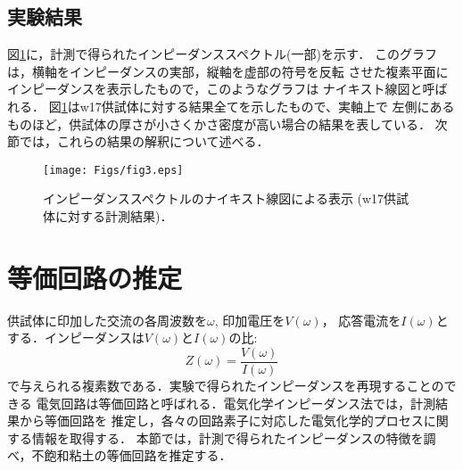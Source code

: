 \documentclass{jsce}
\begin{document}
\subsection{実験結果}
図\ref{fig:fig3}に，計測で得られたインピーダンススペクトル(一部)を示す．
このグラフは，横軸をインピーダンスの実部，縦軸を虚部の符号を反転
させた複素平面にインピーダンスを表示したもので，このようなグラフは
ナイキスト線図と呼ばれる．
図\ref{fig:fig3}はw17供試体に対する結果全てを示したもので、実軸上で
左側にあるものほど，供試体の厚さが小さくかさ密度が高い場合の結果を表している．
次節では，これらの結果の解釈について述べる．
\begin{figure}[h]
	\begin{center}
	\texttt{[image: Figs/fig3.eps]} 
	\end{center}
	\caption{
		インピーダンススペクトルのナイキスト線図による表示
		(w17供試体に対する計測結果)．
	} 
	\label{fig:fig3}
\end{figure}
\section{等価回路の推定}
供試体に印加した交流の各周波数を$\omega$, 印加電圧を$V(\omega)$，
応答電流を$I(\omega)$とする．インピーダンスは$V(\omega)$と$I(\omega)$の比:
\begin{equation}
	Z(\omega)=\frac{V(\omega)}{I(\omega)}
	\label{eqn:def_Z}
\end{equation}
で与えられる複素数である．実験で得られたインピーダンスを再現することのできる
電気回路は等価回路と呼ばれる．電気化学インピーダンス法では，計測結果から等価回路を
推定し，各々の回路素子に対応した電気化学的プロセスに関する情報を取得する．
本節では，計測で得られたインピーダンスの特徴を調べ，不飽和粘土の等価回路を推定する．
\end{document}

